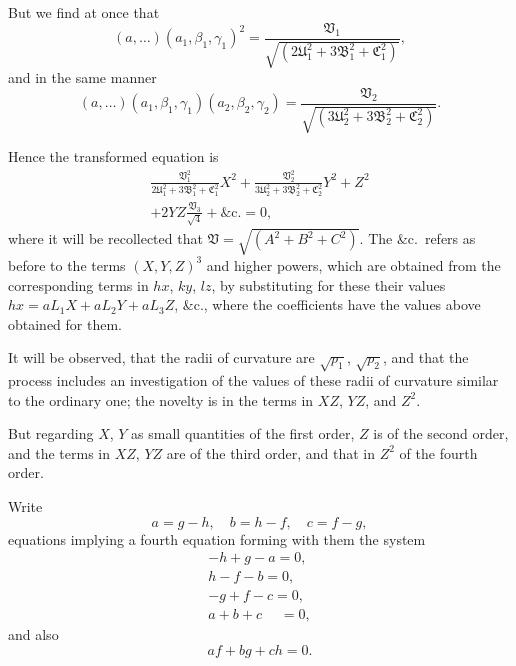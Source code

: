 \documentclass[11pt,a4paper]{book}
\begin{document}
But we find at once that
\[
(a,\ldots)(a_1, \beta_1, \gamma_1)^2 = \frac{\mathfrak{V}_1}{\sqrt{(2\mathfrak{U}_1^2 + 3\mathfrak{B}_1^2 + \mathfrak{C}_1^2)}},
\]
and in the same manner
\[
(a,\ldots)(a_1, \beta_1, \gamma_1)(a_2, \beta_2, \gamma_2) = \frac{\mathfrak{V}_2}{\sqrt{(3\mathfrak{U}_2^2 + 3\mathfrak{B}_2^2 + \mathfrak{C}_2^2)}}.
\]

Hence the transformed equation is
\begin{multline*}
\frac{\mathfrak{V}_1^2}{2\mathfrak{U}_1^2 + 3\mathfrak{B}_1^2 + \mathfrak{C}_1^2}X^2 + \frac{\mathfrak{V}_2^2}{3\mathfrak{U}_2^2 + 3\mathfrak{B}_2^2 + \mathfrak{C}_2^2}Y^2 + Z^2 \\
+ 2YZ\frac{\mathfrak{V}_3}{\sqrt{4}} + \&\text{c.} = 0,
\end{multline*}
where it will be recollected that $\mathfrak{V} = \sqrt{(A^2 + B^2 + C^2)}$. The \&c.\ refers as before to the terms $(X,Y,Z)^3$ and higher powers, which are obtained from the corresponding terms in $hx$, $ky$, $lz$, by substituting for these their values $hx = aL_1X + aL_2Y + aL_3Z$, \&c., where the coefficients have the values above obtained for them.

It will be observed, that the radii of curvature are $\sqrt{p_1}$, $\sqrt{p_2}$, and that the process includes an investigation of the values of these radii of curvature similar to the ordinary one; the novelty is in the terms in $XZ$, $YZ$, and $Z^2$.

But regarding $X$, $Y$ as small quantities of the first order, $Z$ is of the second order, and the terms in $XZ$, $YZ$ are of the third order, and that in $Z^2$ of the fourth order.

\newpage


Write
\[
a = g - h, \quad b = h - f, \quad c = f - g,
\]
equations implying a fourth equation forming with them the system
\begin{gather*}
-h + g - a = 0, \\
h - f - b = 0, \\
-g + f - c = 0, \\
a + b + c \quad\; = 0,
\end{gather*}
and also
\[
af + bg + ch = 0.
\]
\end{document}
